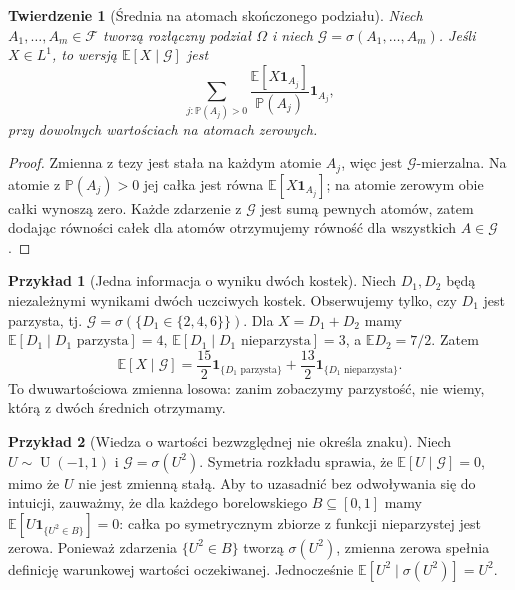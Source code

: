 \documentclass[11pt,a4paper,oneside]{report}
\numberwithin{equation}{chapter}
\theoremstyle{plain}
\newtheorem{twierdzenie}{Twierdzenie}[chapter]
\theoremstyle{definition}
\newtheorem{przyklad}{Przykład}[chapter]
\theoremstyle{remark}
\newcommand{\Prob}{\mathbb{P}}
\newcommand{\E}{\mathbb{E}}
\newcommand{\ind}[1]{\mathbf{1}_{#1}}
\newcommand{\Unif}{\operatorname{U}}
\begin{document}
\begin{twierdzenie}[Średnia na atomach skończonego podziału]
Niech $A_1,\ldots,A_m\in\mathcal F$ tworzą
rozłączny podział $\Omega$ i niech
$\mathcal G=\sigma(A_1,\ldots,A_m)$.
Jeśli $X\in L^1$, to wersją $\E[X\mid\mathcal G]$ jest
\[
\sum_{j:\Prob(A_j)>0}
\frac{\E[X\ind{A_j}]}{\Prob(A_j)}\ind{A_j},
\]
przy dowolnych wartościach na atomach zerowych.
\end{twierdzenie}
\begin{proof}
Zmienna z tezy jest stała na każdym atomie $A_j$,
więc jest $\mathcal G$-mierzalna. Na atomie
z $\Prob(A_j)>0$ jej całka jest równa
$\E[X\ind{A_j}]$; na atomie zerowym obie całki
wynoszą zero. Każde zdarzenie z $\mathcal G$
jest sumą pewnych atomów, zatem dodając równości
całek dla atomów otrzymujemy równość dla wszystkich
$A\in\mathcal G$.
\end{proof}

\begin{przyklad}[Jedna informacja o wyniku dwóch kostek]
Niech $D_1,D_2$ będą niezależnymi wynikami dwóch
uczciwych kostek. Obserwujemy tylko, czy $D_1$ jest
parzysta, tj. $\mathcal G=\sigma(\{D_1\in\{2,4,6\}\})$.
Dla $X=D_1+D_2$ mamy
$\E[D_1\mid D_1\text{ parzysta}]=4$,
$\E[D_1\mid D_1\text{ nieparzysta}]=3$,
a $\E D_2=7/2$. Zatem
\[
\E[X\mid\mathcal G]
=\frac{15}{2}\ind{\{D_1\text{ parzysta}\}}
+\frac{13}{2}\ind{\{D_1\text{ nieparzysta}\}}.
\]
To dwuwartościowa zmienna losowa: zanim zobaczymy
parzystość, nie wiemy, którą z dwóch średnich otrzymamy.
\end{przyklad}

\begin{przyklad}[Wiedza o wartości bezwzględnej nie określa znaku]
Niech $U\sim\Unif(-1,1)$ i
$\mathcal G=\sigma(U^2)$. Symetria rozkładu sprawia,
że $\E[U\mid\mathcal G]=0$, mimo że $U$ nie jest
zmienną stałą. Aby to uzasadnić bez odwoływania się
do intuicji, zauważmy, że dla każdego borelowskiego
$B\subseteq[0,1]$ mamy
$\E[U\ind{\{U^2\in B\}}]=0$:
całka po symetrycznym zbiorze z funkcji nieparzystej
jest zerowa. Ponieważ zdarzenia $\{U^2\in B\}$
tworzą $\sigma(U^2)$, zmienna zerowa spełnia
definicję warunkowej wartości oczekiwanej.
Jednocześnie $\E[U^2\mid\sigma(U^2)]=U^2$.
\end{przyklad}
\end{document}
